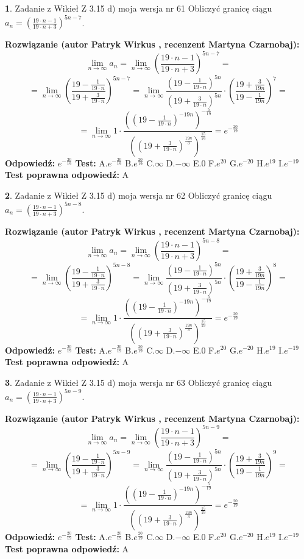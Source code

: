 \documentclass[12pt, a4paper]{article}
\theoremstyle{definition} %
\newtheorem{zad}{}
\newcommand{\zadStart}[1]{\begin{zad}#1\newline}
\newcommand{\zadStop}{\end{zad}}
\newcommand{\rozwStart}[2]{\noindent \textbf{Rozwiązanie (autor #1 , recenzent #2): }\newline}
\newcommand{\rozwStop}{\newline}
\newcommand{\odpStart}{\noindent \textbf{Odpowiedź:}\newline}
\newcommand{\odpStop}{\newline}
\newcommand{\testStart}{\noindent \textbf{Test:}\newline}
\newcommand{\testStop}{\newline}
\newcommand{\kluczStart}{\noindent \textbf{Test poprawna odpowiedź:}\newline}
\newcommand{\kluczStop}{\newline}
\begin{document}
\zadStart{Zadanie z Wikieł Z 3.15 d) moja wersja nr 61}
Obliczyć granicę ciągu $a_{n}=(\frac{19\cdot n - 1}{19 \cdot n + 3})^{5n-7}$.
\zadStop
\rozwStart{Patryk Wirkus}{Martyna Czarnobaj}
$$\lim\limits_{n\to\infty} a_{n} = \lim\limits_{n\to\infty}(\frac{19\cdot n - 1}{19 \cdot n + 3})^{5n-7}=$$
$$=\lim\limits_{n\to\infty}(\frac{19 - \frac{1}{19\cdot n}}{19 + \frac{3}{19 \cdot n}})^{5n-7}=\lim\limits_{n\to\infty}\frac{(19 - \frac{1}{19\cdot n})^{5n}}{(19 + \frac{3}{19\cdot n})^{5n}} \cdot (\frac{19+\frac{3}{19n}}{19-\frac{1}{19n}})^{7}=$$
$$=\lim\limits_{n\to\infty} 1 \cdot \frac{((19-\frac{1}{19 \cdot n})^{-19n})^{-\frac{5}{19}}}{((19+\frac{3}{19 \cdot n})^{\frac{19n}{3}})^{\frac{15}{19}}} =e^{-\frac{20}{19}}$$
\rozwStop
\odpStart
$e^{-\frac{20}{19}}$
\odpStop
\testStart
A.$ e^{-\frac{20}{19}}$
B.$ e^{\frac{20}{19}}$
C.$\infty$
D.$-\infty$
E.$0$
F.$e^{20}$
G.$e^{-20}$
H.$e^{19}$
I.$e^{-19}$
\testStop
\kluczStart
A
\kluczStop



\zadStart{Zadanie z Wikieł Z 3.15 d) moja wersja nr 62}
Obliczyć granicę ciągu $a_{n}=(\frac{19\cdot n - 1}{19 \cdot n + 3})^{5n-8}$.
\zadStop
\rozwStart{Patryk Wirkus}{Martyna Czarnobaj}
$$\lim\limits_{n\to\infty} a_{n} = \lim\limits_{n\to\infty}(\frac{19\cdot n - 1}{19 \cdot n + 3})^{5n-8}=$$
$$=\lim\limits_{n\to\infty}(\frac{19 - \frac{1}{19\cdot n}}{19 + \frac{3}{19 \cdot n}})^{5n-8}=\lim\limits_{n\to\infty}\frac{(19 - \frac{1}{19\cdot n})^{5n}}{(19 + \frac{3}{19\cdot n})^{5n}} \cdot (\frac{19+\frac{3}{19n}}{19-\frac{1}{19n}})^{8}=$$
$$=\lim\limits_{n\to\infty} 1 \cdot \frac{((19-\frac{1}{19 \cdot n})^{-19n})^{-\frac{5}{19}}}{((19+\frac{3}{19 \cdot n})^{\frac{19n}{3}})^{\frac{15}{19}}} =e^{-\frac{20}{19}}$$
\rozwStop
\odpStart
$e^{-\frac{20}{19}}$
\odpStop
\testStart
A.$ e^{-\frac{20}{19}}$
B.$ e^{\frac{20}{19}}$
C.$\infty$
D.$-\infty$
E.$0$
F.$e^{20}$
G.$e^{-20}$
H.$e^{19}$
I.$e^{-19}$
\testStop
\kluczStart
A
\kluczStop



\zadStart{Zadanie z Wikieł Z 3.15 d) moja wersja nr 63}
Obliczyć granicę ciągu $a_{n}=(\frac{19\cdot n - 1}{19 \cdot n + 3})^{5n-9}$.
\zadStop
\rozwStart{Patryk Wirkus}{Martyna Czarnobaj}
$$\lim\limits_{n\to\infty} a_{n} = \lim\limits_{n\to\infty}(\frac{19\cdot n - 1}{19 \cdot n + 3})^{5n-9}=$$
$$=\lim\limits_{n\to\infty}(\frac{19 - \frac{1}{19\cdot n}}{19 + \frac{3}{19 \cdot n}})^{5n-9}=\lim\limits_{n\to\infty}\frac{(19 - \frac{1}{19\cdot n})^{5n}}{(19 + \frac{3}{19\cdot n})^{5n}} \cdot (\frac{19+\frac{3}{19n}}{19-\frac{1}{19n}})^{9}=$$
$$=\lim\limits_{n\to\infty} 1 \cdot \frac{((19-\frac{1}{19 \cdot n})^{-19n})^{-\frac{5}{19}}}{((19+\frac{3}{19 \cdot n})^{\frac{19n}{3}})^{\frac{15}{19}}} =e^{-\frac{20}{19}}$$
\rozwStop
\odpStart
$e^{-\frac{20}{19}}$
\odpStop
\testStart
A.$ e^{-\frac{20}{19}}$
B.$ e^{\frac{20}{19}}$
C.$\infty$
D.$-\infty$
E.$0$
F.$e^{20}$
G.$e^{-20}$
H.$e^{19}$
I.$e^{-19}$
\testStop
\kluczStart
A
\kluczStop
\end{document}
